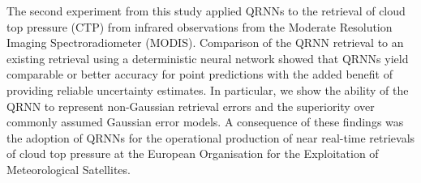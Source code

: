%
%

The second experiment from this study applied QRNNs to the retrieval of cloud
top pressure (CTP) from infrared observations from the Moderate Resolution
Imaging Spectroradiometer (MODIS). Comparison of the QRNN retrieval to an
existing retrieval using a deterministic neural network showed that QRNNs yield
comparable or better accuracy for point predictions with the added benefit of
providing reliable uncertainty estimates. In particular, we show the ability of
the QRNN to represent non-Gaussian retrieval errors and the superiority over
commonly assumed Gaussian error models. A consequence of these findings was the
adoption of QRNNs for the operational production of near real-time retrievals of
cloud top pressure at the European Organisation for the Exploitation of
Meteorological Satellites.

